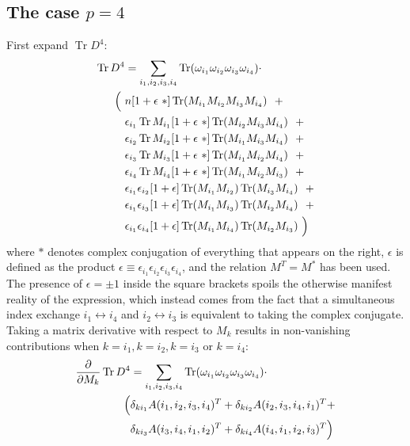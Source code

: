 \documentclass[12pt,a4paper]{article}
\DeclareMathOperator{\Tr}{Tr}
\begin{document}
\subsection{The case $p=4$}
First expand $\Tr D^4$:
\begin{align}\label{eq:trd4}
\Tr D^4 &= \sum_{i_1, i_2, i_3, i_4} \Tr (\omega_{i_1} \omega_{i_2} \omega_{i_3} \omega_{i_4}) \cdot \notag \\
\Big( \ &n [1+\epsilon \ *] \Tr (M_{i_1} M_{i_2} M_{i_3} M_{i_4})  \ \  + \notag \\
&\epsilon_{i_1} \Tr M_{i_1} [1 + \epsilon \ *] \Tr ( M_{i_2} M_{i_3} M_{i_4})  \ \  + \notag \\
&\epsilon_{i_2} \Tr M_{i_2} [1  + \epsilon \ *] \Tr (M_{i_1} M_{i_3} M_{i_4}) \ \  + \notag \\
&\epsilon_{i_3} \Tr M_{i_3} [1 + \epsilon \ *] \Tr (M_{i_1} M_{i_2} M_{i_4})  \ \  + \notag \\
&\epsilon_{i_4} \Tr M_{i_4} [1 + \epsilon \ *] \Tr (M_{i_1} M_{i_2} M_{i_3})  \ \  + \notag \\
&\epsilon_{i_1} \epsilon_{i_2} [1 + \epsilon] \Tr (M_{i_1} M_{i_2} ) \Tr (M_{i_3} M_{i_4})   \ \  + \notag \\
&\epsilon_{i_1} \epsilon_{i_3} [1 + \epsilon] \Tr (M_{i_1} M_{i_3}) \Tr (M_{i_2} M_{i_4})   \ \  + \notag \\
&\epsilon_{i_1} \epsilon_{i_4} [1 + \epsilon] \Tr (M_{i_1} M_{i_4}) \Tr (M_{i_2} M_{i_3})   \ \Big)
\end{align}
where $*$ denotes complex conjugation of everything that appears on the right, $\epsilon$ is defined as the product $\epsilon \equiv \epsilon_{i_1}\epsilon_{i_2}\epsilon_{i_3}\epsilon_{i_4}$, and the relation $M^T = M^*$ has been used. The presence of $\epsilon = \pm 1$ inside the square brackets spoils the otherwise manifest reality of the expression, which instead comes from the fact that a simultaneous index exchange $i_1 \leftrightarrow i_4$ and $i_2 \leftrightarrow i_3$ is equivalent to taking the complex conjugate. \newline
Taking a matrix derivative with respect to $M_k$ results in non-vanishing contributions when $k=i_1, k=i_2, k=i_3$ or $k=i_4$:
\begin{align} \label{eq:derd4}
\frac{\partial}{\partial M_k} \Tr D^4 &= \sum_{i_1, i_2, i_3, i_4} \Tr (\omega_{i_1} \omega_{i_2} \omega_{i_3} \omega_{i_4}) \cdot \notag \\
\Big( &\delta_{ki_1} A(i_1, i_2, i_3, i_4)^T + \delta_{ki_2} A(i_2, i_3, i_4, i_1)^T + \notag \\
&\delta_{ki_3} A(i_3, i_4, i_1, i_2)^T + \delta_{ki_4} A(i_4, i_1, i_2, i_3)^T \Big)
\end{align}
\end{document}
